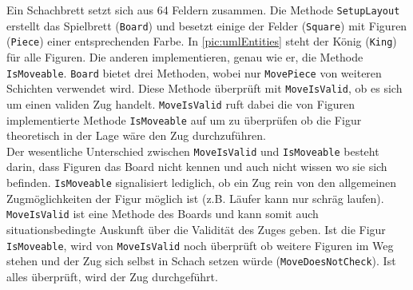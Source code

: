 \documentclass[
10pt, %
a4paper, %
oneside, %
headinclude,footinclude, %
BCOR5mm, %
]{scrartcl}
\begin{document}
\begin{onehalfspace}
Ein Schachbrett setzt sich aus 64 Feldern zusammen. Die Methode \texttt{SetupLayout} erstellt das Spielbrett (\texttt{Board}) und besetzt einige der Felder (\texttt{Square}) mit Figuren (\texttt{Piece}) einer entsprechenden Farbe.
In \autoref{pic:umlEntities} steht der König (\texttt{King}) für alle Figuren. Die anderen implementieren, genau wie er, die Methode \texttt{IsMoveable}.
\texttt{Board} bietet drei Methoden, wobei nur \texttt{MovePiece} von weiteren Schichten verwendet wird. Diese Methode überprüft mit \texttt{MoveIsValid}, ob es sich um einen validen Zug handelt. \texttt{MoveIsValid} ruft dabei die von Figuren implementierte Methode \texttt{IsMoveable} auf um zu überprüfen ob die Figur theoretisch in der Lage wäre den Zug durchzuführen.\\ 
Der wesentliche Unterschied zwischen \texttt{MoveIsValid} und \texttt{IsMoveable} besteht darin, dass Figuren das Board nicht kennen und auch nicht wissen wo sie sich befinden. \texttt{IsMoveable} signalisiert lediglich, ob ein Zug rein von den allgemeinen Zugmöglichkeiten der Figur möglich ist (z.B. Läufer kann nur schräg laufen). \texttt{MoveIsValid} ist eine Methode des Boards und kann somit auch situationsbedingte Auskunft über die Validität des Zuges geben. Ist die Figur \texttt{IsMoveable}, wird von \texttt{MoveIsValid} noch überprüft ob weitere Figuren im Weg stehen und der Zug sich selbst in Schach setzen würde (\texttt{MoveDoesNotCheck}). Ist alles überprüft, wird der Zug durchgeführt.


\end{onehalfspace}
\end{document}
